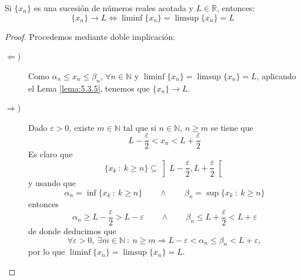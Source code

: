 \begin{prop}
    Si $\{x_n\}$ es una sucesión de números reales acotada y $L \in \mathbb{R}$, entonces:
    \begin{equation*}
        \{x_n\} \longrightarrow L \Longleftrightarrow \liminf \{x_n\} = \limsup \{x_n\} = L
    \end{equation*}
\end{prop}
\begin{proof} Procedemos mediante doble implicación:
\begin{description}
    \item [$\Longleftarrow$)]
        Como $\alpha_n \leq x_n \leq \beta_n$, $\forall n \in \mathbb{N}$
        y $\liminf \{x_n\} = \limsup \{x_n\} = L$, aplicando el Lema \ref{lema:5.3.5}, tenemos que $ \{x_n\} \longrightarrow L$.
        
    \item [$\Longrightarrow$)]
        Dado $\varepsilon > 0$, existe $m \in \mathbb{N}$ tal que si $n \in \mathbb{N}$, $n \geq m$
        se tiene que
        \begin{equation*}
            L - \frac{\varepsilon}{2} < x_n < L + \frac{\varepsilon}{2}
        \end{equation*}
        Es claro que
        \begin{equation*}
            \{x_k ~:~ k \geq n\} \subseteq \left] L - \frac{\varepsilon}{2}, L + \frac{\varepsilon}{2} \right[
        \end{equation*}
        y usando que
        \begin{equation*}
            \alpha_n = \inf \{x_k ~:~ k \geq n\}
            \qquad \land \qquad
            \beta_n = \sup \{x_k ~:~ k \geq n\}
        \end{equation*}
        entonces
        \begin{equation*}
            \alpha_n \geq L - \frac{\varepsilon}{2} > L - \varepsilon 
            \qquad \land \qquad
            \beta_n \leq L + \frac{\varepsilon}{2} < L + \varepsilon 
        \end{equation*}
        de donde deducimos que
        \begin{equation*}
            \forall \varepsilon > 0, ~\exists m \in \mathbb{N} ~:~ n \geq m \Longrightarrow L-\varepsilon < \alpha_n \leq \beta_n < L+\varepsilon,
        \end{equation*}
        por lo que $\liminf \{x_n\} = \limsup \{x_n\} = L$.
\end{description}
\end{proof}

